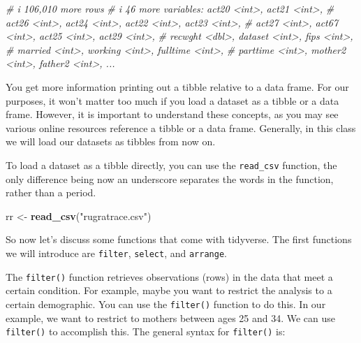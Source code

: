 \documentclass[
]{book}
\newenvironment{Shaded}{\begin{snugshade}}{\end{snugshade}}
\newcommand{\CommentTok}[1]{\textcolor[rgb]{0.56,0.35,0.01}{\textit{#1}}}
\newcommand{\FunctionTok}[1]{\textcolor[rgb]{0.13,0.29,0.53}{\textbf{#1}}}
\newcommand{\NormalTok}[1]{#1}
\newcommand{\OtherTok}[1]{\textcolor[rgb]{0.56,0.35,0.01}{#1}}
\newcommand{\StringTok}[1]{\textcolor[rgb]{0.31,0.60,0.02}{#1}}
\begin{document}
\begin{Shaded}
\begin{Highlighting}[]
\CommentTok{\# i 106,010 more rows}
\CommentTok{\# i 46 more variables: act20 \textless{}int\textgreater{}, act21 \textless{}int\textgreater{},}
\CommentTok{\#   act26 \textless{}int\textgreater{}, act24 \textless{}int\textgreater{}, act22 \textless{}int\textgreater{}, act23 \textless{}int\textgreater{},}
\CommentTok{\#   act27 \textless{}int\textgreater{}, act67 \textless{}int\textgreater{}, act25 \textless{}int\textgreater{}, act29 \textless{}int\textgreater{},}
\CommentTok{\#   recwght \textless{}dbl\textgreater{}, dataset \textless{}int\textgreater{}, fips \textless{}int\textgreater{},}
\CommentTok{\#   married \textless{}int\textgreater{}, working \textless{}int\textgreater{}, fulltime \textless{}int\textgreater{},}
\CommentTok{\#   parttime \textless{}int\textgreater{}, mother2 \textless{}int\textgreater{}, father2 \textless{}int\textgreater{}, ...}
\end{Highlighting}
\end{Shaded}

You get more information printing out a tibble relative to a data frame. For our purposes, it won't matter too much if you load a dataset as a tibble or a data frame. However, it is important to understand these concepts, as you may see various online resources reference a tibble or a data frame. Generally, in this class we will load our datasets as tibbles from now on.

To load a dataset as a tibble directly, you can use the \texttt{read\_csv} function, the only difference being now an underscore separates the words in the function, rather than a period.

\begin{Shaded}
\begin{Highlighting}[]
\NormalTok{rr }\OtherTok{\textless{}{-}} \FunctionTok{read\_csv}\NormalTok{(}\StringTok{"rugratrace.csv"}\NormalTok{)}
\end{Highlighting}
\end{Shaded}

So now let's discuss some functions that come with tidyverse. The first functions we will introduce are \texttt{filter}, \texttt{select}, and \texttt{arrange}.

The \texttt{filter()} function retrieves observations (rows) in the data that meet a certain condition. For example, maybe you want to restrict the analysis to a certain demographic. You can use the \texttt{filter()} function to do this. In our example, we want to restrict to mothers between ages 25 and 34. We can use \texttt{filter()} to accomplish this. The general syntax for \texttt{filter()} is:
\end{document}
